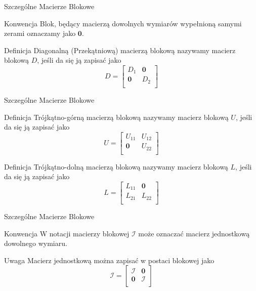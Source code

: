 \documentclass{beamer}
\newcommand{\zero}{\mathbf{0}}
\newcommand{\id}{\mathcal{I}}
\begin{document}
\begin{frame}{Szczególne Macierze Blokowe}
    \begin{alertblock}{Konwencja}
        Blok, będący macierzą dowolnych wymiarów wypełnioną samymi zerami oznaczamy jako $\zero$.
    \end{alertblock}
    \begin{block}{Definicja}
        \alert{Diagonalną (Przekątniową) macierzą blokową} nazywamy macierz blokową $D$, jeśli da się ją zapisać jako
        $$ D = \begin{bmatrix}
            D_1 & \zero \\ \zero & D_2 \\
        \end{bmatrix}$$
    \end{block}
    
\end{frame}

\begin{frame}{Szczególne Macierze Blokowe}
    \begin{block}{Definicja}
        \alert{Trójkątno-górną macierzą blokową} nazywamy macierz blokową $U$, jeśli da się ją zapisać jako
        $$ U = \begin{bmatrix}
            U_{11} & U_{12} \\ \zero & U_{22} \\  
        \end{bmatrix}$$
    \end{block}
    \begin{block}{Definicja}
        \alert{Trójkątno-dolną macierzą blokową} nazywamy macierz blokową $L$, jeśli da się ją zapisać jako 
        $$ L = \begin{bmatrix}
            L_{11} & \zero \\ L_{21} & L_{22} \\
        \end{bmatrix}$$
    \end{block}
\end{frame}

\begin{frame}{Szczególne Macierze Blokowe}
    \begin{alertblock}{Konwencja}
        W notacji macierzy blokowej $\id$ może oznaczać macierz jednostkową dowolnego wymiaru. 
    \end{alertblock}
    \begin{block}{Uwaga }
        Macierz jednostkową można zapisać w postaci blokowej jako
        $$ \id = \begin{bmatrix}
            \id & \zero \\ \zero & \id \\
        \end{bmatrix}$$
    \end{block}
\end{frame}
\end{document}
